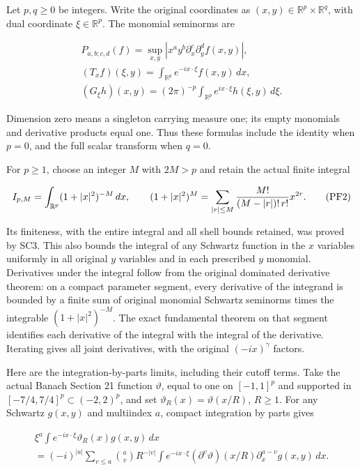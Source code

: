 \documentclass[
  11pt,
]{article}
\begin{document}
Let \(p,q\geq0\) be integers. Write the original coordinates as
\((x,y)\in\mathbb R^p\times\mathbb R^q\), with dual coordinate
\(\xi\in\mathbb R^p\). The monomial seminorms are

\[
\begin{aligned}
 P_{a,b;c,d}(f)=\sup_{x,y}
       |x^a y^b\partial_x^c\partial_y^d f(x,y)|,
 \qquad\\
 (T_xf)(\xi,y)=\int_{\mathbb R^p}e^{-ix\cdot\xi}f(x,y)\,dx,
 \qquad\\
 (G_\xi h)(x,y)=(2\pi)^{-p}
           \int_{\mathbb R^p}e^{ix\cdot\xi}h(\xi,y)\,d\xi.
 \end{aligned}
\tag{PF1}
\]

Dimension zero means a singleton carrying measure one; its empty
monomials and derivative products equal one. Thus these formulas include
the identity when \(p=0\), and the full scalar transform when \(q=0\).

For \(p\geq1\), choose an integer \(M\) with \(2M>p\) and retain the
actual finite integral

\[
 I_{p,M}=\int_{\mathbb R^p}(1+|x|^2)^{-M}\,dx,
 \qquad
 (1+|x|^2)^M=
    \sum_{|r|\leq M}{M!\over(M-|r|)!\,r!}x^{2r}.
 \tag{PF2}
\]

Its finiteness, with the entire integral and all shell bounds retained,
was proved by SC3. This also bounds the integral of any Schwartz
function in the \(x\) variables uniformly in all original \(y\)
variables and in each prescribed \(y\) monomial. Derivatives under the
integral follow from the original dominated derivative theorem: on a
compact parameter segment, every derivative of the integrand is bounded
by a finite sum of original monomial Schwartz seminorms times the
integrable \((1+|x|^2)^{-M}\). The exact fundamental theorem on that
segment identifies each derivative of the integral with the integral of
the derivative. Iterating gives all joint derivatives, with the original
\((-ix)^\gamma\) factors.

Here are the integration-by-parts limits, including their cutoff terms.
Take the actual Banach Section 21 function \(\vartheta\), equal to one
on \([-1,1]^p\) and supported in \([-7/4,7/4]^p\subset(-2,2)^p\), and
set \(\vartheta_R(x)=\vartheta(x/R)\), \(R\geq1\). For any Schwartz
\(g(x,y)\) and multiindex \(a\), compact integration by parts gives

\[
\begin{aligned}
 \xi^a\int e^{-ix\cdot\xi}\vartheta_R(x)g(x,y)\,dx
 \\
 =(-i)^{|a|}\sum_{v\leq a}{a\choose v}R^{-|v|}
       \int e^{-ix\cdot\xi}
          (\partial^v\vartheta)(x/R)
          \partial_x^{a-v}g(x,y)\,dx.
 \end{aligned}
\tag{PF3}
\]
\end{document}
